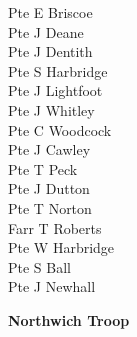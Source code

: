 \begin{multicols}{2}
  Pte E Briscoe \\
  Pte J Deane \\
  Pte J Dentith \\
  Pte S Harbridge \\
  Pte J Lightfoot \\
  Pte J Whitley \\
  Pte C Woodcock \\
  Pte J Cawley \\
  Pte T Peck \\
  Pte J Dutton \\
  Pte T Norton \\
  Farr T Roberts \\
  Pte W Harbridge \\
  Pte S Ball \\
  Pte J Newhall \\
\end{multicols}

\begin{center}
  \Large
  \textbf{Northwich Troop}
\end{center}

